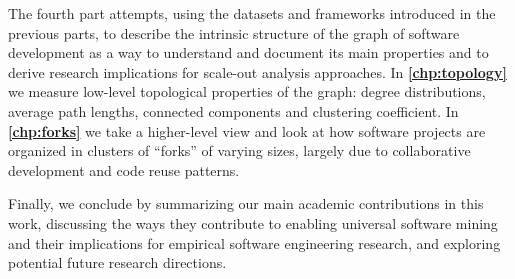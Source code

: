 The fourth part attempts, using the datasets and frameworks introduced in the
previous parts, to describe the intrinsic structure of the graph of software
development as a way to understand and document its main properties and to
derive research implications for scale-out analysis approaches. In
\textbf{\cref{chp:topology}} we measure low-level topological properties of the
graph: degree distributions, average path lengths, connected components and
clustering coefficient. In \textbf{\cref{chp:forks}} we take a higher-level
view and look at how software projects are organized in clusters of ``forks''
of varying sizes, largely due to collaborative development and code reuse
patterns.

Finally, we conclude by summarizing our main academic contributions in this
work, discussing the ways they contribute to enabling universal software mining
and their implications for empirical software engineering research, and
exploring potential future research directions.
